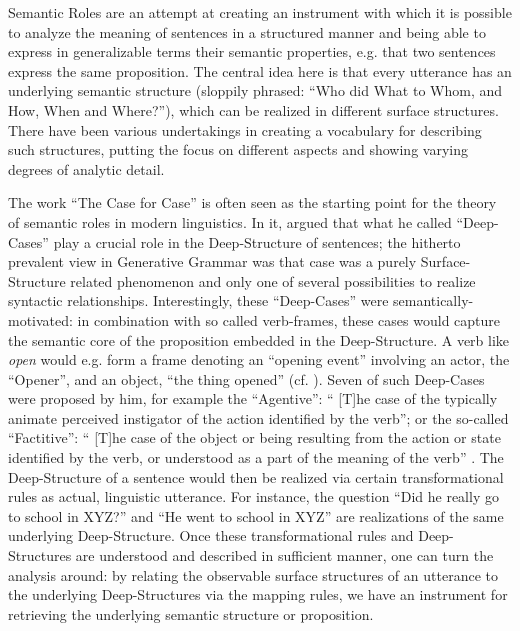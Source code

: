 Semantic Roles are an attempt at creating an instrument with which it is possible to analyze the
meaning of sentences in a structured manner and being able to express in generalizable terms
their semantic properties, e.g. that two sentences express the same proposition. The central idea
here is that every utterance has an underlying semantic structure
(sloppily phrased: ``Who did What to Whom, and How, When and Where?''), which can be realized in
different surface structures. There have been various undertakings in creating a vocabulary for
describing such structures, putting the focus on different aspects and showing varying degrees of
analytic detail.

The work ``The Case for Case'' \citep{fillmore1967case} is often seen as the starting point for
the theory of semantic roles in modern linguistics. In it, \citeauthor{fillmore1967case} argued
that what he called ``Deep-Cases'' play a crucial role in the Deep-Structure of sentences; the
hitherto prevalent view in Generative Grammar was that case was a purely Surface-Structure related
phenomenon and only one of several possibilities to realize syntactic relationships. Interestingly,
these ``Deep-Cases'' were semantically-motivated: in combination with so called verb-frames, these
cases would capture the semantic core of the proposition embedded in the Deep-Structure. A verb
like \emph{open} would e.g. form a frame denoting an ``opening event'' involving an actor, the
``Opener'', and an object, ``the thing opened'' (cf. \cite[p.~46f.]{fillmore1967case}). Seven
of such Deep-Cases were proposed by him, for example the ``Agentive'': `` [T]he case of the
typically animate perceived instigator of the action identified by the verb''; or the so-called
``Factitive'': `` [T]he case of the object or being resulting from the action or state identified
by the verb, or understood as a part of the meaning of the verb'' \citep[p.~46]{fillmore1967case}.
The Deep-Structure of a sentence would then be realized via certain transformational rules as
actual, linguistic utterance. For instance, the question ``Did he really go to school in XYZ?'' and
``He went to school in XYZ'' are realizations of the same underlying Deep-Structure. Once these
transformational rules and Deep-Structures are understood and described in sufficient manner, one
can turn the analysis around: by relating the observable surface structures of an utterance to
the underlying Deep-Structures via the mapping rules, we have an instrument for retrieving the
underlying semantic structure or proposition.

